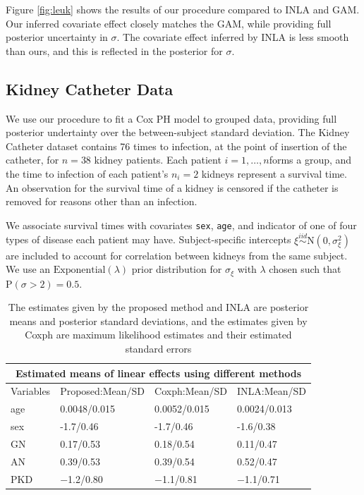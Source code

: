 \documentclass[]{article}
\begin{document}
Figure \ref{fig:leuk} shows the results of our procedure compared to INLA and GAM. Our inferred covariate effect closely matches the GAM, while providing full posterior uncertainty in $\sigma$. The covariate effect inferred by INLA is less smooth than ours, and this is reflected in the posterior for $\sigma$.

\subsection{Kidney Catheter Data}

We use our procedure to fit a Cox PH model to grouped data, providing full posterior undertainty over the between-subject standard deviation. The Kidney Catheter dataset contains 76 times to infection, at the point of insertion of the catheter, for $n = 38$  kidney patients. Each patient $i=1,\ldots,n$forms a group, and the time to infection of each patient's $n_{i} = 2$ kidneys represent a survival time. An observation for the survival time of a kidney is censored if the catheter is removed for reasons other than an infection. 

We associate survival times with covariates \texttt{sex}, \texttt{age}, and indicator of one of four types of disease each patient may have. Subject-specific intercepts $\xi\overset{iid}{\sim}\text{N}(0,\sigma^{2}_{\xi})$ are included to account for correlation between kidneys from the same subject. We use an $\text{Exponential}(\lambda)$ prior distribution for $\sigma_{\xi}$ with $\lambda$ chosen such that $\text{P}(\sigma > 2) = 0.5$.

\begin{table}[ht]
\centering
\begin{tabular}{ |p{3cm}||p{3cm}|p{3cm}|p{3cm}|}
 \hline
 \multicolumn{4}{|c|}{Estimated means of linear effects using different methods} \\
 \hline
 Variables & Proposed:Mean/SD & Coxph:Mean/SD &INLA:Mean/SD \\
 \hline
 age & 0.0048/0.015 & 0.0052/0.015 & 0.0024/0.013\\
 sex & -1.7/0.46  & -1.7/0.46 &  -1.6/0.38\\
 GN & 0.17/0.53 &  0.18/0.54 & 0.11/0.47\\
 AN & 0.39/0.53 & 0.39/0.54 & 0.52/0.47\\
 PKD & −1.2/0.80  & −1.1/0.81 & −1.1/0.71\\
\hline
\end{tabular}
\caption{The estimates given by the proposed method and INLA are posterior means and posterior standard deviations, and the estimates given by Coxph are maximum likelihood estimates and their estimated standard errors}
\label{table:KidneyFixed}
\end{table}
\end{document}
